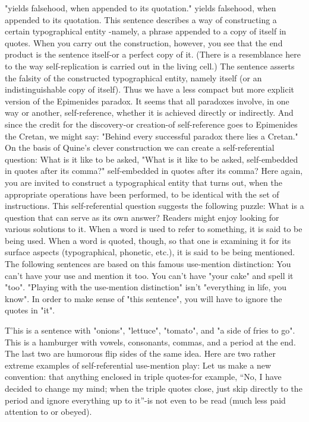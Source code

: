 "yields falsehood, when appended to its quotation." yields falsehood, when appended to its quotation. 
This sentence describes a way of constructing a certain typographical entity -namely, a phrase appended to a copy of itself in quotes. When you carry out the construction, however, you see that the end product is the sentence itself-or a perfect copy of it. (There is a resemblance here to the way self-replication is carried out in the living cell.) The sentence asserts the falsity of the constructed typographical entity, namely itself (or an indistinguishable copy of itself). Thus we have a less compact but more explicit version of the Epimenides paradox. It seems that all paradoxes involve, in one way or another, self-reference, whether it is achieved directly or indirectly. And since the credit for the discovery-or creation-of self-reference goes to Epimenides the Cretan, we might say: "Behind every successful paradox there lies a Cretan." On the basis of Quine's clever construction we can create a self-referential question: 
What is it like to be asked, "What is it like to be asked, self-embedded in quotes after its comma?" self-embedded in quotes after its comma? 
Here again, you are invited to construct a typographical entity that turns out, when the appropriate operations have been performed, to be identical with the set of instructions. This self-referential question suggests the following puzzle: What is a question that can serve as its own answer? Readers might enjoy looking for various solutions to it. 
\separator
When a word is used to refer to something, it is said to be being used. When a word is quoted, though, so that one is examining it for its surface aspects (typographical, phonetic, etc.), it is said to be being mentioned. The following sentences are based on this famous use-mention distinction: 
You can't have your use and mention it too. 
You can't have "your cake" and spell it "too". 
"Playing with the use-mention distinction" isn't "everything in life, you know". 
In order to make sense of "this sentence", you will have to ignore the quotes in "it". 



T'his is a sentence with "onions", "lettuce", "tomato", and "a side of fries to go". 
This is a hamburger with vowels, consonants, commas, and a period at the end. 
The last two are humorous flip sides of the same idea. Here are two rather extreme examples of self-referential use-mention play: 
Let us make a new convention: that anything enclosed in triple quotes-for example, "`No, I have decided to change my mind; when the triple quotes close, just skip directly to the period and ignore everything up to it"'-is not even to be read (much less paid attention to or obeyed). 

